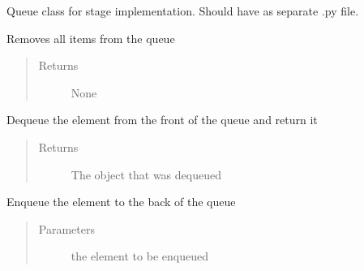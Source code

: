 \documentclass[letterpaper,10pt,english]{sphinxmanual}
\begin{document}
\begin{fulllineitems}
\label{\detokenize{index:droogCNC.Queue}}
\sphinxAtStartPar
Queue class for stage implementation. Should have as separate .py file.

\begin{fulllineitems}
\label{\detokenize{index:droogCNC.Queue.clear}}
\sphinxAtStartPar
Removes all items from the queue
\begin{quote}\begin{description}
\item[{Returns}] \leavevmode
\sphinxAtStartPar
None

\end{description}\end{quote}

\end{fulllineitems}


\begin{fulllineitems}
\label{\detokenize{index:droogCNC.Queue.dequeue}}
\sphinxAtStartPar
Dequeue the element from the front of the queue and return it
\begin{quote}\begin{description}
\item[{Returns}] \leavevmode
\sphinxAtStartPar
The object that was dequeued

\end{description}\end{quote}

\end{fulllineitems}


\begin{fulllineitems}
\label{\detokenize{index:droogCNC.Queue.enqueue}}
\sphinxAtStartPar
Enqueue the element to the back of the queue
\begin{quote}\begin{description}
\item[{Parameters}] \leavevmode
\sphinxAtStartPar
{} \textendash{} the element to be enqueued


\end{description}
\end{quote}
\end{fulllineitems}
\end{fulllineitems}
\end{document}
